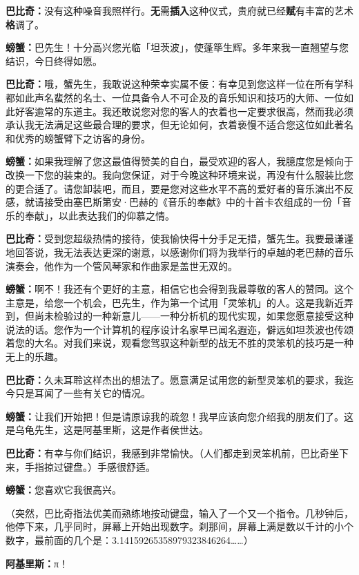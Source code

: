 \documentclass[
  12pt,
  twoside,
  openright,
  oldfontcommands,
]{memoir}
\newcommand{\kaitismall}[1]{{\kaitifamily\small #1}}
\newcommand{\heititext}[1]{{\heifamily\bfseries #1}}
\newcommand{\dialogname}[1]{{\heifamily\bfseries #1}}
\begin{document}
\dialogname{巴比奇：}没有这种噪音我照样行。\heititext{无}需\heititext{插入}这种仪式，贵府就已经\heititext{赋}有丰富的艺术\heititext{格}调了。

\dialogname{螃蟹：}巴先生！十分高兴您光临「坦茨波」，使蓬筚生辉。多年来我一直翘望与您结识，今日终得如愿。

\dialogname{巴比奇：}哦，蟹先生，我敢说这种荣幸实属不佞：有幸见到您这样一位在所有学科都如此声名蜚然的名士、一位具备令人不可企及的音乐知识和技巧的大师、一位如此好客逾常的东道主。我还敢说您对您的客人的衣着也一定要求很高，然而我必须承认我无法满足这些最合理的要求，但无论如何，衣着亵慢不适合您这位如此著名和优秀的螃蟹臂下之访客的身份。

\dialogname{螃蟹：}如果我理解了您这最值得赞美的自白，最受欢迎的客人，我臆度您是倾向于改换一下您的装束的。我向您保证，对于今晚这种环境来说，再没有什么服装比您的更合适了。请您卸装吧，而且，要是您对这些水平不高的爱好者的音乐演出不反感，就请接受由塞巴斯第安·巴赫的《音乐的奉献》中的十首卡农组成的一份「音乐的奉献」，以此表达我们的仰慕之情。

\dialogname{巴比奇：}受到您超级热情的接待，使我愉快得十分手足无措，蟹先生。我要最谦谨地回答说，我无法表达更深的谢意，以感谢你们将为我举行的卓越的老巴赫的音乐演奏会，他作为一个管风琴家和作曲家是盖世无双的。

\dialogname{螃蟹：}啊不！我还有个更好的主意，相信它也会得到我最尊敬的客人的赞同。这个主意是，给您一个机会，巴先生，作为第一个试用「灵笨机」的人。这是我新近弄到，但尚未检验过的一种新意儿------一种分析机的现代实现，如果您愿意接受这种说法的话。您作为一个计算机的程序设计名家早已闻名遐迩，僻远如坦茨波也传颂着您的大名。对我们来说，观看您驾驭这种新型的战无不胜的灵笨机的技巧是一种无上的乐趣。

\dialogname{巴比奇：}久未耳聆这样杰出的想法了。愿意满足试用您的新型灵笨机的要求，我迄今只是耳闻了一些有关它的情况。

\dialogname{螃蟹：}让我们开始把！但是请原谅我的疏忽！我早应该向您介绍我的朋友们了。这是乌龟先生，这是阿基里斯，这是作者侯世达。

\dialogname{巴比奇：}有幸与你们结识，我感到非常愉快。\kaitismall{（人们都走到灵笨机前，巴比奇坐下来，手指掠过键盘。）}手感很舒适。

\dialogname{螃蟹：}您喜欢它我很高兴。

（突然，巴比奇指法优美而熟练地按动键盘，输入了一个又一个指令。几秒钟后，他停下来，几乎同时，屏幕上开始出现数字。刹那间，屏幕上满是数以千计的小个数字，最前面的几个是：3.14159265358979323846264\ldots\ldots）

\dialogname{阿基里斯：}π！
\end{document}
